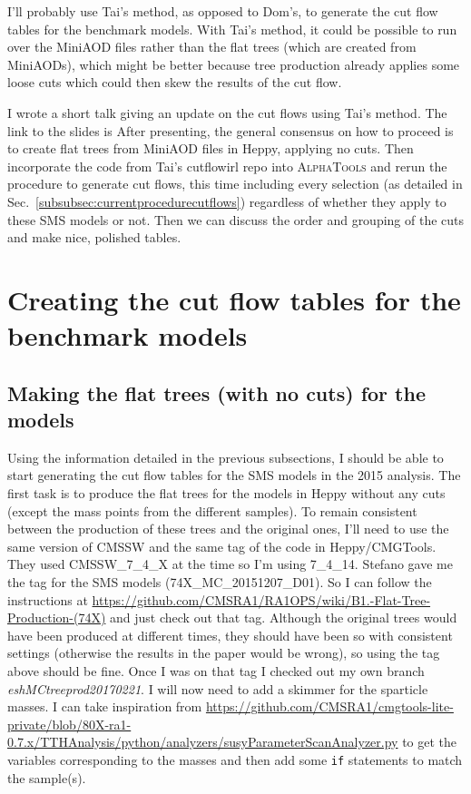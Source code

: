 I'll probably use Tai's method, as opposed to Dom's, to generate the cut flow tables for the benchmark models. With Tai's method, it could be possible to run over the MiniAOD files rather than the flat trees (which are created from MiniAODs), which might be better because tree production already applies some loose cuts which could then skew the results of the cut flow.  

I wrote a short talk giving an update on the cut flows using Tai's method. The link to the slides is %
After presenting, the general consensus on how to proceed is to create flat trees from MiniAOD files in Heppy, applying no cuts. Then incorporate the code from Tai's cutflowirl repo into \textsc{AlphaTools} and rerun the procedure to generate cut flows, this time including every selection (as detailed in Sec.~\ref{subsubsec:currentprocedurecutflows}) regardless of whether they apply to these SMS models or not. Then we can discuss the order and grouping of the cuts and make nice, polished tables.

\section{Creating the cut flow tables for the benchmark models}

\subsection{Making the flat trees (with no cuts) for the models}

Using the information detailed in the previous subsections, I should be able to start generating the cut flow tables for the SMS models in the 2015 analysis. The first task is to produce the flat trees for the models in Heppy without any cuts (except the mass points from the different samples). To remain consistent between the production of these trees and the original ones, I'll need to use the same version of CMSSW and the same tag of the code in Heppy/CMGTools. They used CMSSW\_7\_4\_X at the time so I'm using 7\_4\_14. Stefano gave me the tag for the SMS models (74X\_MC\_20151207\_D01). So I can follow the instructions at \url{https://github.com/CMSRA1/RA1OPS/wiki/B1.-Flat-Tree-Production-(74X)} and just check out that tag. Although the original trees would have been produced at different times, they should have been so with consistent settings (otherwise the results in the paper would be wrong), so using the tag above should be fine. Once I was on that tag I checked out my own branch \emph{eshMCtreeprod20170221}. I will now need to add a skimmer for the sparticle masses. I can take inspiration from \url{https://github.com/CMSRA1/cmgtools-lite-private/blob/80X-ra1-0.7.x/TTHAnalysis/python/analyzers/susyParameterScanAnalyzer.py} to get the variables corresponding to the masses and then add some \verb!if! statements to match the sample(s).

